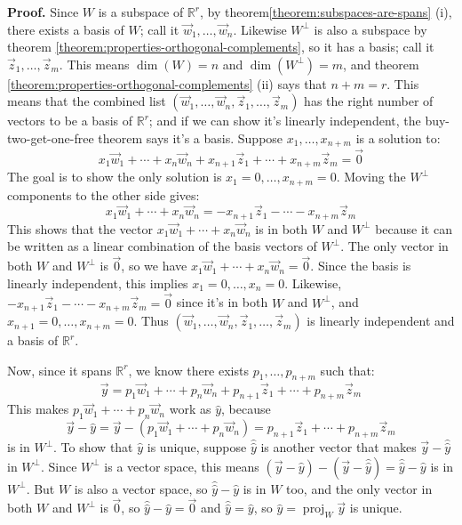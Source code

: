 \documentclass[11pt, letterpaper]{report}
\newenvironment{book}{}{}
\newcounter{theorem}[chapter]
\newcommand{\R}{\mathbb{R}}
\DeclareMathOperator{\proj}{proj}
\begin{document}
\begin{book}
\textbf{Proof.} Since $W$ is a subspace of $\R^r$, by theorem\ref{theorem:subspaces-are-spans} (i), there exists a basis of $W$; call it $\vec{w}_1,\ldots,\vec{w}_n$. Likewise $W^{\perp}$ is also a subspace by theorem \ref{theorem:properties-orthogonal-complements}, so it has a basis; call it $\vec{z}_1,\ldots,\vec{z}_m$. This means $\dim(W) = n$ and $\dim(W^{\perp})=m$, and theorem \ref{theorem:properties-orthogonal-complements} (ii) says that $n+m=r$. This means that the combined list $(\vec{w}_1,\ldots,\vec{w}_n,\vec{z}_1,\ldots,\vec{z}_m)$ has the right number of vectors to be a basis of $\R^r$; and if we can show it's linearly independent, the buy-two-get-one-free theorem says it's a basis. Suppose $x_1,\ldots,x_{n+m}$ is a solution to:
\[x_1\vec{w}_1+\cdots+x_n\vec{w}_n+x_{n+1}\vec{z}_1+\cdots+x_{n+m}\vec{z}_m = \vec{0}\]
The goal is to show the only solution is $x_1=0, \ldots, x_{n+m}=0$. Moving the $W^{\perp}$ components to the other side gives:
\[x_1\vec{w}_1+\cdots+x_n\vec{w}_n = -x_{n+1}\vec{z}_1-\cdots-x_{n+m}\vec{z}_m \]
This shows that the vector $x_1\vec{w}_1+\cdots+x_n\vec{w}_n$ is in both $W$ and $W^{\perp}$ because it can be written as a linear combination of the basis vectors of $W^{\perp}$. The only vector in both $W$ and $W^{\perp}$ is $\vec{0}$, so we have $x_1\vec{w}_1+\cdots+x_n\vec{w}_n = \vec{0}$. Since the basis is linearly independent, this implies $x_1=0, \ldots, x_n=0$.  Likewise, $-x_{n+1}\vec{z}_1-\cdots-x_{n+m}\vec{z}_m = \vec{0}$ since it's in both $W$ and $W^{\perp}$, and $x_{n+1}=0, \ldots, x_{n+m}=0$. Thus $(\vec{w}_1,\ldots,\vec{w}_n,\vec{z}_1,\ldots,\vec{z}_m)$ is linearly independent and a basis of $\R^r$.

Now, since it spans $\R^r$, we know there exists $p_1,\ldots,p_{n+m}$ such that:
\[\vec{y}= p_1\vec{w}_1+\cdots+p_n\vec{w}_n+p_{n+1}\vec{z}_1+\cdots+p_{n+m}\vec{z}_m\]
This makes $p_1\vec{w}_1+\cdots+p_n\vec{w}_n$ work as $\hat{y}$, because 
\[\vec{y}-\hat{y} = \vec{y}- ( p_1\vec{w}_1+\cdots+p_n\vec{w}_n ) =  p_{n+1}\vec{z}_1+\cdots+p_{n+m}\vec{z}_m\]
is in $W^{\perp}$. To show that $\hat{y}$ is unique, suppose $\hat{\hat{y}}$ is another vector that makes $\vec{y}-\hat{\hat{y}}$ in $W^{\perp}$. Since $W^{\perp}$ is a vector space, this means $( \vec{y}-\hat{y} ) - ( \vec{y}-\hat{\hat{y}} ) = \hat{\hat{y}} - \hat{y}$ is in $W^{\perp}$. But $W$ is also a vector space, so $\hat{\hat{y}} - \hat{y}$ is in $W$ too, and the only vector in both $W$ and $W^{\perp}$ is $\vec{0}$, so $\hat{\hat{y}} - \hat{y} = \vec{0}$ and $\hat{\hat{y}} = \hat{y}$, so $\hat{y}=\proj_W\vec{y}$ is unique. \blacksquare
\end{book}
\end{document}
